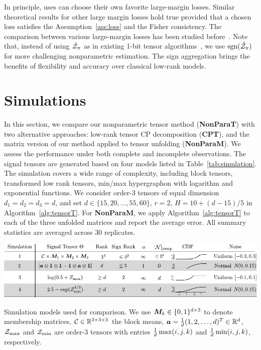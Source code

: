 \documentclass[twoside,11pt]{article}
\theoremstyle{plain}
\theoremstyle{definition}
\def\sign{\textup{sgn}}
\begin{document}
In principle, uses can choose their own favorite large-margin losses. Similar theoretical  results for other large margin losses  hold true provided that a chosen loss satisfies the Assumption~\ref{ass:loss} and the Fisher consistency.  The comparison between various large-margin losses has been studied before~\cite{bartlett2006convexity}. Note that, instead of using $\hat {\mathcal{Z}}_\pi$ as in existing 1-bit tensor algorithms~\cite{ghadermarzy2018learning,wang2018learning}, we use $\sign(\hat \tZ_\pi)$ for more challenging nonparametric estimation. The sign aggregation brings the benefits of flexibility and accuracy over classical low-rank models. 


\section{Simulations}\label{sec:simulation}

In this section, we compare our nonparametric tensor method ({\bf NonParaT}) with two alternative approaches: low-rank tensor CP decomposition ({\bf CPT}), and the matrix version of our method applied to tensor unfolding ({\bf NonParaM}). We assess the performance under both complete and incomplete observations. The signal tensors are generated based on four models listed in Table~\ref{tab:simulation}. The simulation covers a wide range of complexity, including block tensors, transformed low rank tensors, min/max hypergraphon with logarithm and exponential functions. We consider order-3  tensors of equal dimension $d_1=d_2=d_3=d$, and set $d\in \{15, 20,\ldots,55,60\}$, $r=2$, $H=10+{(d-15)/ 5}$ in Algorithm~\ref{alg:tensorT}. For {\bf NonParaM}, we apply Algorithm~\ref{alg:tensorT} to each of the three unfolded matrices and report the average error. All summary statistics are averaged across $30$ replicates.  

\begin{table}[h]
\includegraphics[width=1\textwidth]{figure/simulation.pdf}
\caption{Simulation models used for comparison. We use $\bm M_k\in\{0,1\}^{d\times 3}$ to denote membership matrices, $\mathcal{C}\in\mathbb{R}^{3\times 3\times 3}$ the block means, $\bm{a}={1\over d}(1,2,\ldots,d)^T \in\mathbb{R}^d$, $\mathcal{Z}_{\max}$ and $\mathcal{Z}_{\min}$ are order-3 tensors with entries ${1\over d}\max(i,j,k)$ and ${1\over d}\min(i,j,k)$, respectively.}\label{tab:simulation}
\end{table}
\end{document}
